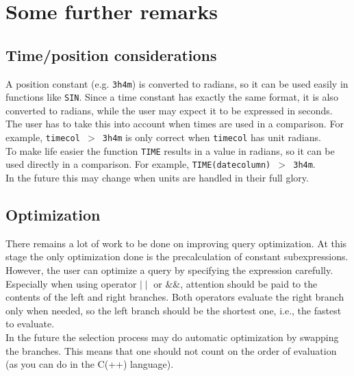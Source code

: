 \section{Some further remarks}
\subsection{Time/position considerations}
A position constant (e.g. \texttt{3h4m}) is converted to
radians, so it can be used easily in functions like \texttt{SIN}.
Since a time constant has exactly the same format, it is
also converted to radians, while the user may expect it to be
expressed in seconds. The user has to take this into account
when times are used in a comparison. For example, \texttt{timecol $>$ 3h4m}
is only correct when \texttt{timecol} has unit radians.
\\To make life easier the function \texttt{TIME} results in a value
in radians, so it can be used directly in a comparison. For example,
\texttt{TIME(datecolumn) $>$ 3h4m}.
\\In the future this may change when units are handled in their full glory.

\subsection{Optimization}
There remains a lot of work to be done on improving query optimization.
At this stage the only optimization done is the precalculation of constant
subexpressions.
\\
However, the user can optimize a query by specifying the expression
carefully. Especially when using operator $\mid\mid$ or \&\&,
attention should be
paid to the contents of the left and right branches. Both operators
evaluate the right branch only when needed, so the left branch
should be the shortest one, i.e., the fastest to evaluate.
\\In the future the selection process may do automatic optimization
by swapping the branches. This means that one should not count on
the order of evaluation (as you can do in the C(++) language).

